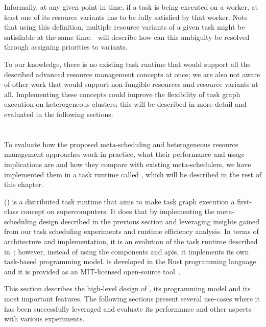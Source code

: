 \vspace{1mm}Informally, at any given point in time, if a task is being executed on a worker, at
least one of its resource variants has to be fully satisfied by that worker. Note that using this definition,
multiple resource variants of a given task might be satisfiable at the same
time.~ will describe how can this ambiguity be resolved through assigning
priorities to variants.

To our knowledge, there is no existing task runtime that would support all the described advanced
resource management concepts at once; we are also not aware of other work that would support
non-fungible resources and resource variants at all. Implementing these concepts could improve the
flexibility of task graph execution on heterogeneous clusters; this will be described in more
detail and evaluated in the following sections.

\section{\hyperqueue{}}
\label{sec:hyperqueue}
To evaluate how the proposed meta-scheduling and heterogeneous resource management approaches work
in practice, what their performance and usage implications are and how they compare with existing
meta-schedulers, we have implemented them in a task runtime called \hyperqueue{}, which
will be described in the rest of this chapter.

\hyperqueue{} (\hq{}) is a distributed task runtime that aims to make task graph execution a
first-class concept on supercomputers. It does that by implementing the meta-scheduling design
described in the previous section and leveraging insights gained from our task scheduling
experiments and \dask{} runtime efficiency analysis. In terms of architecture and
implementation, it is an evolution of the \rsds{} task runtime described
in~; however, instead of using the \dask{} components and
\glspl{api}, it implements its own task-based programming model.
\hyperqueue{} is developed in the Rust programming language~\cite{rust} and
it is provided as an \mbox{MIT-licensed} open-source tool~\cite{hq_github}.

This section describes the high-level design of \hyperqueue{}, its programming model and
its most important features. The following sections present several use-cases where it has been
successfully leveraged and evaluate its performance and other aspects with various experiments.

